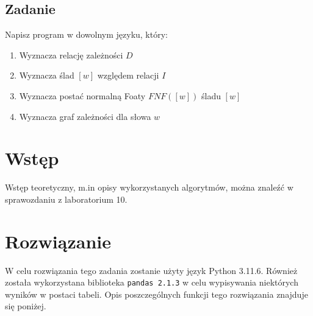 \documentclass[11pt]{article}
\providecommand{\tightlist}{%
      \setlength{\itemsep}{0pt}\setlength{\parskip}{0pt}}
\begin{document}
\hypertarget{zadanie}{%
\subsection{Zadanie}\label{zadanie}}

Napisz program w dowolnym języku, który:

\begin{enumerate}
\def\labelenumi{\arabic{enumi}.}
\tightlist
\item
  Wyznacza relację zależności \(D\)
\item
  Wyznacza ślad \([w]\) względem relacji \(I\)
\item
  Wyznacza postać normalną Foaty \(FNF([w])\) śladu \([w]\)
\item
  Wyznacza graf zależności dla słowa \(w\)
\end{enumerate}

    \hypertarget{wstux119p}{%
\section{Wstęp}\label{wstux119p}}

Wstęp teoretyczny, m.in opisy wykorzystanych algorytmów, można znaleźć w
sprawozdaniu z laboratorium 10.

    \hypertarget{rozwiux105zanie}{%
\section{Rozwiązanie}\label{rozwiux105zanie}}

W celu rozwiązania tego zadania zostanie użyty język Python 3.11.6.
Również została wykorzystana biblioteka \texttt{pandas\ 2.1.3} w celu
wypisywania niektórych wyników w postaci tabeli. Opis poszczególnych
funkcji tego rozwiązania znajduje się poniżej.
\end{document}
